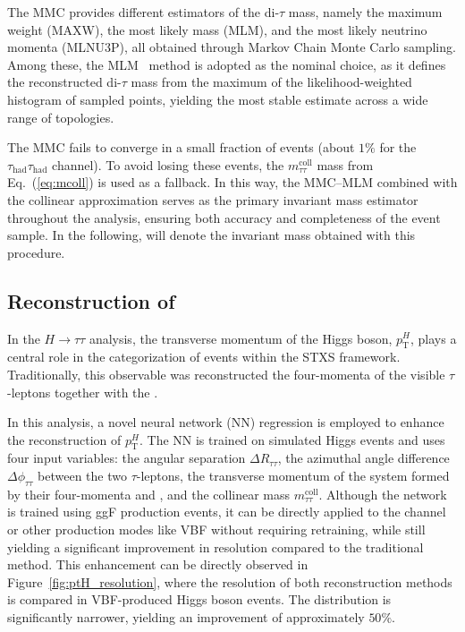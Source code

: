The MMC provides different estimators of the di-$\tau$ mass, namely the maximum weight (MAXW), the most likely mass (MLM), and the most likely neutrino momenta (MLNU3P), all obtained through Markov Chain Monte Carlo sampling. Among these, the MLM~\cite{mlm_thesis} method is adopted as the nominal choice, as it defines the reconstructed di-$\tau$ mass from the maximum of the likelihood-weighted histogram of sampled points, yielding the most stable estimate across a wide range of topologies.  

The MMC fails to converge in a small fraction of events (about $1\%$ for the $\tau_{\text{had}}\tau_{\text{had}}$ channel). To avoid losing these events, the $m_{\tau\tau}^{\text{coll}}$ mass from Eq.~(\ref{eq:mcoll}) is used as a fallback. In this way, the MMC–MLM combined with the collinear approximation serves as the primary invariant mass estimator throughout the analysis, ensuring both accuracy and completeness of the event sample. In the following, \mtt will denote the invariant mass obtained with this procedure.

\subsection{Reconstruction of \pth}
\label{subsec:higgs_mass}

In the $H \to \tau\tau$ analysis, the transverse momentum of the Higgs boson, $p_{\text{T}}^H$, plays a central role in the categorization of events within the STXS framework. Traditionally, this observable was reconstructed the four-momenta of the visible $\tau$-leptons together with the \etmiss.

In this analysis, a novel neural network (NN) regression is employed to enhance the reconstruction of $p_{\text{T}}^H$. The NN is trained on simulated Higgs events and uses four input variables: the angular separation $\Delta R_{\tau\tau}$, the azimuthal angle difference $\Delta \phi_{\tau\tau}$ between the two $\tau$-leptons, the transverse momentum of the system formed by their four-momenta and \etmiss, and the collinear mass $m_{\tau\tau}^{\text{coll}}$. Although the network is trained using ggF production events, it can be directly applied to the \ttHtt channel or other production modes like VBF without requiring retraining, while still yielding a significant improvement in resolution compared to the traditional method.
This enhancement can be directly observed in Figure~\ref{fig:ptH_resolution}, where the resolution of both reconstruction methods is compared in VBF-produced Higgs boson events. The distribution is significantly narrower, yielding an improvement of approximately $50\%$.

